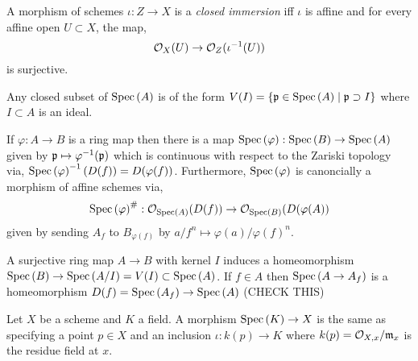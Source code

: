 \documentclass[12pt]{article}
\begin{document}
\begin{definition}
A morphism of schemes $\iota : Z \to X$ is a \textit{closed immersion} iff $\iota$ is affine and for every affine open $U \subset X$, the map,
\[ \mathcal{O}_{X}(U) \to \mathcal{O}_{Z}(\iota^{-1}(U)) \]
is surjective. 
\end{definition}

\begin{remark}
Any closed subset of $\mathrm{Spec}\left( A \right)$ is of the form $V(I) = \{ \mathfrak{p} \in \mathrm{Spec}\left( A \right) \mid \mathfrak{p} \supset I \}$ where $I \subset A$ is an ideal. 
\end{remark}

\begin{remark}
If $\varphi : A \to B$ is a ring map then there is a map $\mathrm{Spec}\left( \varphi \right) : \mathrm{Spec}\left( B \right) \to \mathrm{Spec}\left( A \right)$ given by $\mathfrak{p} \mapsto \varphi^{-1}(\mathfrak{p})$ which is continuous with respect to the Zariski topology via, $\mathrm{Spec}\left( \varphi \right)^{-1}(D(f)) = D(\varphi(f))$. Furthermore, $\mathrm{Spec}\left( \varphi \right)$ is canoncially a morphism of affine schemes via,
\[ \mathrm{Spec}\left( \varphi \right)^\# : \mathcal{O}_{\mathrm{Spec}\left( A \right)}(D(f)) \to \mathcal{O}_{\mathrm{Spec}\left( B \right)}(D(\varphi(A)) \]
given by sending $A_f$ to $B_{\varphi(f)}$ by $a/f^n \mapsto \varphi(a) / \varphi(f)^n$. 
\end{remark}

\begin{proposition}
A surjective ring map $A \to B$ with kernel $I$ induces a homeomorphism $\mathrm{Spec}\left( B \right) \to \mathrm{Spec}\left( A/I \right) = V(I) \subset \mathrm{Spec}\left( A \right)$. If $f \in A$ then $\mathrm{Spec}\left( A \to A_f \right)$ is a homeomorphism $D(f) = \mathrm{Spec}\left( A_f \right) \to \mathrm{Spec}\left( A \right)$
(CHECK THIS)
\end{proposition}


\begin{proposition}
Let $X$ be a scheme and $K$ a field. A morphism $\mathrm{Spec}\left( K \right) \to X$ is the same as specifying a point $p \in X$ and an inclusion $\iota : k(p) \to K$ where $k(p) = \mathcal{O}_{X, x} / \mathfrak{m}_x$ is the residue field at $x$.
\end{proposition}
\end{document}
